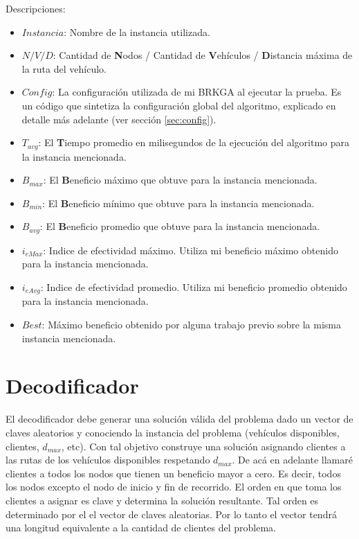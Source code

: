 Descripciones:
\begin{itemize}
	\item \textbf{$Instancia$}: Nombre de la instancia utilizada.
	\item \textbf{$N/V/D$}: Cantidad de \textbf{N}odos / Cantidad de \textbf{V}ehículos / \textbf{D}istancia máxima de la ruta del vehículo.
	\item \textbf{$Config$}: La configuración utilizada de mi BRKGA al ejecutar la prueba. Es un código que sintetiza la configuración global del algoritmo, explicado en detalle más adelante (ver sección \ref{sec:config}).
	\item \textbf{$T_{avg}$}: El \textbf{T}iempo promedio en milisegundos de la ejecución del algoritmo para la instancia mencionada.
	\item \textbf{$B_{max}$}: El \textbf{B}eneficio máximo que obtuve para la instancia mencionada.
	\item \textbf{$B_{min}$}: El \textbf{B}eneficio mínimo que obtuve para la instancia mencionada.
	\item \textbf{$B_{avg}$}: El \textbf{B}eneficio promedio que obtuve para la instancia mencionada.
	\item \textbf{$i_{eMax}$}: Indice de efectividad máximo. Utiliza mi beneficio máximo obtenido para la instancia mencionada.
	\item \textbf{$i_{eAvg}$}: Indice de efectividad promedio. Utiliza mi beneficio promedio obtenido para la instancia mencionada.
	\item \textbf{$Best$}: Máximo beneficio obtenido por alguna trabajo previo sobre la misma instancia mencionada.
\end{itemize}

\section{Decodificador}

El decodificador debe generar una solución válida del problema dado un vector de claves aleatorios y conociendo la instancia del problema (vehículos disponibles, clientes, $d_{max}$, etc). Con tal objetivo construye una solución asignando clientes a las rutas de los vehículos disponibles respetando $d_{max}$. De acá en adelante llamaré clientes a todos los nodos que tienen un beneficio mayor a cero. Es decir, todos los nodos excepto el nodo de inicio y fin de recorrido. El orden en que toma los clientes a asignar es clave y determina la solución resultante. Tal orden es determinado por el el vector de claves aleatorias. Por lo tanto el vector tendrá una longitud equivalente a la cantidad de clientes del problema.

